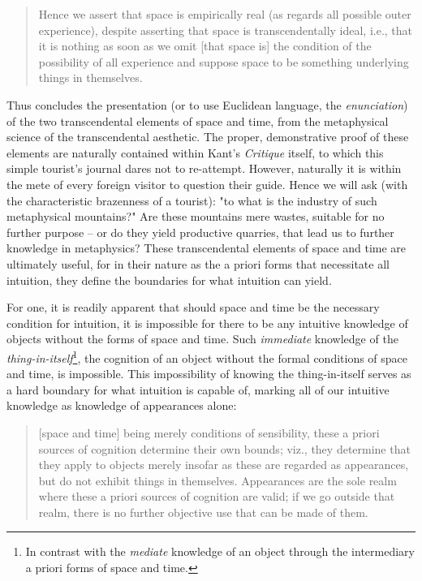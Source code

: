 \begin{quote}
Hence we assert that space is empirically real (as regards all possible outer experience), despite asserting that space is transcendentally ideal, i.e., that it is nothing as soon as we omit [that space is] the condition of the possibility of all experience and suppose space to be something underlying things in themselves.

\autocite[B45]{hackett}
\end{quote}

Thus concludes the presentation (or to use Euclidean language, the \emph{enunciation}) of the two transcendental elements of space and time, from the metaphysical science of the transcendental aesthetic. The proper, demonstrative proof of these elements are naturally contained within Kant's \emph{Critique} itself, to which this simple tourist's journal dares not to re-attempt. However, naturally it is within the mete of every foreign visitor to question their guide. Hence we will ask (with the characteristic brazenness of a tourist): "to what is the industry of such metaphysical mountains?" Are these mountains mere wastes, suitable for no further purpose -- or do they yield productive quarries, that lead us to further knowledge in metaphysics? These transcendental elements of space and time are ultimately useful, for in their nature as the a priori forms that necessitate all intuition, they define the boundaries for what intuition can yield.

For one, it is readily apparent that should space and time be the necessary condition for intuition, it is impossible for there to be any intuitive knowledge of objects without the forms of space and time. Such \emph{immediate} knowledge of the \emph{thing-in-itself}\footnote{In contrast with the \emph{mediate} knowledge of an object through the intermediary a priori forms of space and time.}, the cognition of an object without the formal conditions of space and time, is impossible. This impossibility of knowing the thing-in-itself serves as a hard boundary for what intuition is capable of, marking all of our intuitive knowledge as knowledge of appearances alone:

\begin{quote}
  [space and time] being merely conditions of sensibility, these a priori sources of cognition determine their own bounds; viz., they determine that they apply to objects merely insofar as these are regarded as appearances, but do not exhibit things in themselves. Appearances are the sole realm where these a priori sources of cognition are valid; if we go outside that realm, there is no further objective use that can be made of them.

  \autocite[B56]{hackett}
\end{quote}

